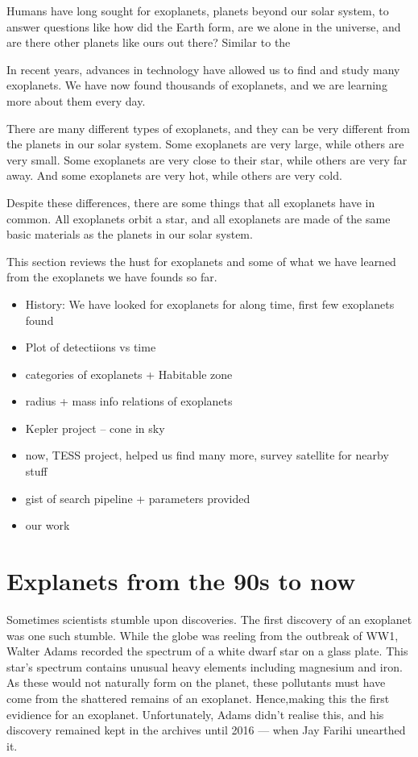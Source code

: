 Humans have long sought for exoplanets, planets beyond our solar system, to answer questions like how did the Earth form, are we alone in the universe, and are there other planets like ours out there? 
Similar to the 


In recent years, advances in technology have allowed us to find and study many exoplanets. We have now found thousands of exoplanets, and we are learning more about them every day.

There are many different types of exoplanets, and they can be very different from the planets in our solar system. Some exoplanets are very large, while others are very small. Some exoplanets are very close to their star, while others are very far away. And some exoplanets are very hot, while others are very cold.

Despite these differences, there are some things that all exoplanets have in common. All exoplanets orbit a star, and all exoplanets are made of the same basic materials as the planets in our solar system.


This section reviews the hust for exoplanets and some of what we have learned from the exoplanets we have founds so far. 

\begin{itemize}
    \item History: We have looked for exoplanets for along time, first few exoplanets found 
    \item Plot of detectiions vs time
    \item categories of exoplanets + Habitable zone
    \item radius + mass info relations of exoplanets 
    \item Kepler project -- cone in sky
    \item now, TESS project, helped us find many more, survey satellite for nearby stuff
    \item gist of search pipeline + parameters provided
    \item our work 
\end{itemize}

\section{Explanets from the 90s to now}



Sometimes scientists stumble upon discoveries. 
The first discovery of an exoplanet was one such stumble.
While the globe was reeling from the outbreak of WW1, Walter Adams recorded the spectrum of a white dwarf star on a glass plate. 
This star's spectrum contains unusual heavy elements including magnesium and iron. 
As these would not naturally form on the planet, these pollutants must have come from the shattered remains of an exoplanet. 
Hence,making this the first evidience for an exoplanet. 
Unfortunately, Adams didn't realise this, and his discovery remained kept in the archives until 2016 — when Jay Farihi unearthed it.

